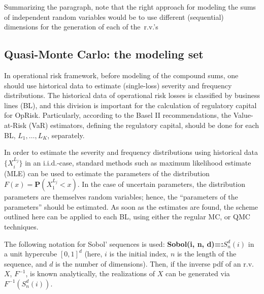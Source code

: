 \begin{multicols}{2}
{}

Summarizing the paragraph, note that the right approach for
modeling the sums of independent random variables would be
to use different (sequential) dimensions for the generation of each
of the~r.v.'s



\subsection{Quasi-Monte Carlo: the modeling set}\label{Makin}

\noindent
In operational risk framework, before modeling of the compound sums,
one should use historical data to estimate (single-loss) severity
and frequency distributions. The historical data of operational risk
losses is classified by business lines (BL), and this division is
important for the calculation of regulatory capital for OpRisk.
Particularly, according to the Basel II recommendations, the
Value-at-Risk  (VaR) estimators, defining the regulatory capital, should be
done for each BL, $L_1,\dots,L_K$, separately.

In order to estimate the severity and frequency distributions using
historical data $\{X^{L_j}_i\}$ in an i.i.d.-case, standard methods
such as maximum likelihood estimate (MLE) can be used to estimate the parameters of the
distribution $F(x)=\mathbf{P}\left(X^{L_j}_1<x\right)$. In the case
of uncertain parameters, the distribution parameters are themselves
random variables; hence, the ``parameters of the parameters'' should be
estimated. As soon as the estimates are found, the scheme outlined
here can be applied to each BL, using either the
regular MC, or QMC techniques.

The following notation for Sobol' sequences is used: {\bf Sobol(i, n,
d)=:$S^d_n(i)$} in a unit hypercube $[0,1]^d$ (here, $i$ is the
initial index, $n$ is the length of the sequence, and $d$ is the
number of dimensions). Then, if the inverse pdf of an r.v.~$X$,
$F^{-1}$, is known analytically, the realizations of $X$ can be
generated via $F^{-1}\left(S^d_n(i)\right)$.


\end{multicols}

